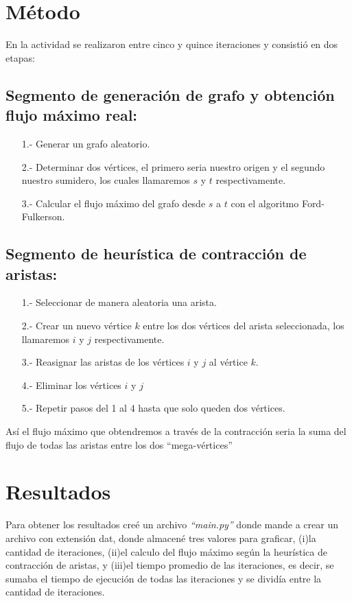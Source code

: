 \documentclass[12pt,letterpaper]{article}
\begin{document}
\section*{Método}
En la actividad se realizaron entre cinco y quince iteraciones y consistió en dos etapas:

\subsection*{Segmento de generación de grafo y obtención flujo máximo real:}
\begin{itemize}
\item[1.-]Generar un grafo aleatorio.
\item[2.-]Determinar dos vértices, el primero seria nuestro origen y el segundo nuestro sumidero, los cuales llamaremos $s$ y $t$ respectivamente.
\item[3.-]Calcular el flujo máximo del grafo desde $s$ a $t$ con el algoritmo Ford-Fulkerson.
\end{itemize}


\subsection*{Segmento de heurística de contracción de aristas:}
\begin{itemize}
\item[1.-]Seleccionar de manera aleatoria una arista.
\item[2.-]Crear un nuevo vértice $k$ entre los dos vértices del arista seleccionada, los llamaremos $i$ y $j$ respectivamente.
\item[3.-]Reasignar las aristas de los vértices $i$ y $j$ al vértice $k$.
\item[4.-]Eliminar los vértices $i$ y $j$
\item[5.-]Repetir pasos del 1 al 4 hasta que solo queden dos vértices.
\end{itemize}
Así el flujo máximo que obtendremos a través de la contracción seria la suma del flujo de todas las aristas entre los dos “mega-vértices”



\section*{Resultados}
Para obtener los resultados creé un archivo \textit{“main.py”} donde mande a crear un archivo con extensión dat, donde almacené tres valores para graficar, (i)la cantidad de iteraciones, (ii)el calculo del flujo máximo según la heurística de contracción de aristas, y (iii)el tiempo promedio de las iteraciones, es decir, se sumaba el tiempo de ejecución de todas las iteraciones y se dividía entre la cantidad de iteraciones. 
\end{document}
